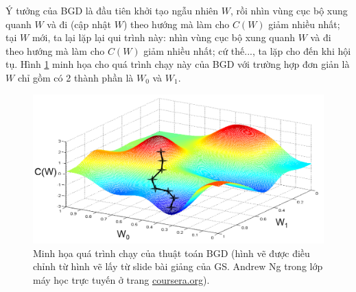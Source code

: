 Ý tưởng của BGD là đầu tiên khởi tạo ngẫu nhiên $W$, rồi nhìn vùng cục bộ xung quanh $W$ và đi (cập nhật $W$) theo hướng mà làm cho $C(W)$ giảm nhiều nhất; tại $W$ mới, ta lại lặp lại qui trình này: nhìn vùng cục bộ xung quanh $W$ và đi theo hướng mà làm cho $C(W)$ giảm nhiều nhất; cứ thế..., ta lặp cho đến khi hội tụ. Hình \ref{fig_BGD} minh họa cho quá trình chạy này của BGD với trường hợp đơn giản là $W$ chỉ gồm có 2 thành phần là $W_0$ và $W_1$.
\begin{figure}
	\centering
	\includegraphics[width=\textwidth]{BGD}
	\caption[Minh họa quá trình chạy của thuật toán BGD]{Minh họa quá trình chạy của thuật toán BGD (hình vẽ được điều chỉnh từ hình vẽ lấy từ slide bài giảng của GS. Andrew Ng trong lớp máy học trực tuyến ở trang \url{coursera.org}).}
	\label{fig_BGD}
\end{figure}

